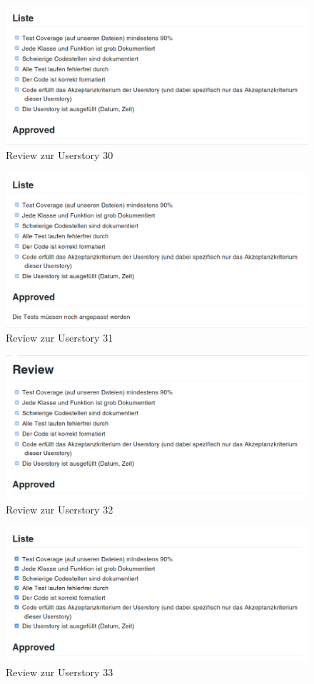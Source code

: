 \documentclass[accentcolor=tud9c,12pt,paper=a4]{tudreport}
\begin{document}
\begin{figure}[H]
\centering
\includegraphics[width=.8\textwidth]{code_review/us30}
\caption{Review zur Userstory 30}
\end{figure}

\begin{figure}[H]
\centering
\includegraphics[width=.8\textwidth]{code_review/us31}
\caption{Review zur Userstory 31}
\end{figure}

\begin{figure}[H]
\centering
\includegraphics[width=.8\textwidth]{code_review/us32}
\caption{Review zur Userstory 32}
\end{figure}

\begin{figure}[H]
\centering
\includegraphics[width=.8\textwidth]{code_review/us33}
\caption{Review zur Userstory 33}
\end{figure}
\end{document}
